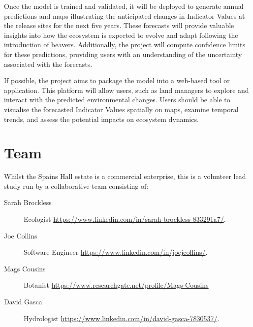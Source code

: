 \documentclass{roles}
\begin{document}
Once the model is trained and validated,
it will be deployed to generate annual predictions and
maps illustrating the anticipated changes in Indicator Values
at the release sites for the next five years.
These forecasts will provide valuable insights
into how the ecosystem is expected to evolve and adapt following the introduction of beavers.
Additionally, the project will compute confidence limits for these predictions,
providing users with an understanding of the uncertainty associated with the forecasts.

If possible, the project aims to package the model into a web-based tool or application.
This platform will allow users,
such as land managers to explore and interact with the predicted environmental changes.
Users should be able to visualise the forecasted Indicator Values spatially on maps,
examine temporal trends, and assess the potential impacts on ecosystem dynamics.

\section*{Team}

Whilst the Spains Hall estate is a commercial enterprise,
this is a volunteer lead study
run by a collaborative team consisting of:

\begin{description}
    \item[Sarah Brockless] Ecologist \href{https://www.linkedin.com/in/sarah-brockless-833291a7/}{https://www.linkedin.com/in/sarah-brockless-833291a7/}.
    \item[Joe Collins] Software Engineer \href{https://www.linkedin.com/in/joejcollins/}{https://www.linkedin.com/in/joejcollins/}.
    \item[Mags Cousins] Botanist \href{https://www.researchgate.net/profile/Mags-Cousins}{https://www.researchgate.net/profile/Mags-Cousins}
    \item[David Gasca] Hydrologist \href{https://www.linkedin.com/in/david-gasca-7830537/}{https://www.linkedin.com/in/david-gasca-7830537/}.
\end{description}
\end{document}
